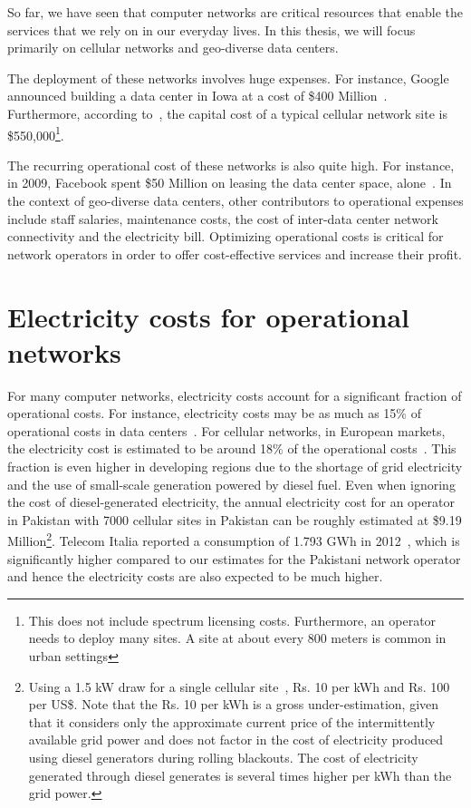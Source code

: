 So far, we have seen that computer networks are critical resources that enable the services that we rely on in our everyday lives. In this thesis, we will focus primarily on cellular networks and geo-diverse data centers. 

The deployment of these networks involves huge expenses. For instance, Google announced building a data center in Iowa at a cost of \$400 Million~\cite{CostOfADC}. Furthermore, according to~\cite{costcellsite}, the capital cost of a typical cellular network site is \$550,000\footnote{This does not include spectrum licensing costs. Furthermore, an operator needs to deploy many sites. A site at about every 800 meters is common in urban settings}. 

The recurring operational cost of these networks is also quite high. For instance, in 2009, Facebook spent \$50 Million on leasing the data center space, alone~\cite{FBLease}. In the context of geo-diverse data centers, other contributors to operational expenses include staff salaries, maintenance costs, the cost of inter-data center network connectivity and the electricity bill. Optimizing operational costs is critical for network operators in order to offer cost-effective services and increase their profit.

\section{Electricity costs for operational networks} 
For many computer networks, electricity costs account for a significant fraction of operational costs. For instance, electricity costs may be as much as 15\% of operational costs in data centers~\cite{costCloud}. For cellular networks, in European markets, the electricity cost is
estimated to be around 18\% of the operational costs~\cite{Blume:2010:BLTJ:CellularPower}.
This fraction is even higher in developing regions due to the shortage of grid electricity and the use of small-scale generation powered by diesel fuel. Even when ignoring the cost of diesel-generated electricity, the annual electricity cost for an operator in Pakistan with 7000 cellular sites in Pakistan can be roughly estimated at \$9.19 Million\footnote{Using a 1.5 kW draw for a single cellular site~\cite{mbakwe:btshybribpower:2011:necec}, Rs. 10 per kWh and Rs. 100 per US\$. Note that the Rs. 10 per kWh is a gross under-estimation, given that it considers only the approximate current price of the intermittently available grid power and does not factor in the cost of electricity produced using diesel generators during rolling blackouts. The cost of electricity generated through diesel generates is several times higher per kWh than the grid power.}. Telecom Italia reported a consumption of 1.793 GWh in 2012~\cite{TIAnnualReport}, which is significantly higher compared to our estimates for the Pakistani network operator and hence the electricity costs are also expected to be much higher. 


